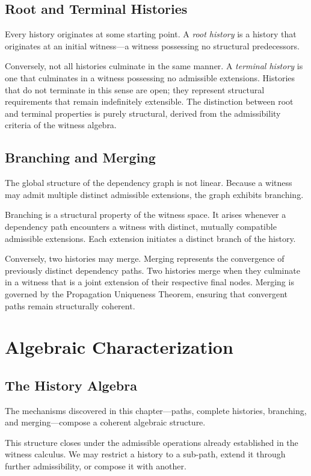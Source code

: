 \documentclass[12pt,anyside]{book}
\begin{document}
\subsection{Root and Terminal Histories}
Every history originates at some starting point. A \textit{root history} is a history that originates at an initial witness---a witness possessing no structural predecessors. 

Conversely, not all histories culminate in the same manner. A \textit{terminal history} is one that culminates in a witness possessing no admissible extensions. Histories that do not terminate in this sense are open; they represent structural requirements that remain indefinitely extensible. The distinction between root and terminal properties is purely structural, derived from the admissibility criteria of the witness algebra.

\subsection{Branching and Merging}
The global structure of the dependency graph is not linear. Because a witness may admit multiple distinct admissible extensions, the graph exhibits branching. 

Branching is a structural property of the witness space. It arises whenever a dependency path encounters a witness with distinct, mutually compatible admissible extensions. Each extension initiates a distinct branch of the history.

Conversely, two histories may merge. Merging represents the convergence of previously distinct dependency paths. Two histories merge when they culminate in a witness that is a joint extension of their respective final nodes. Merging is governed by the Propagation Uniqueness Theorem, ensuring that convergent paths remain structurally coherent.

\section{Algebraic Characterization}

\subsection{The History Algebra}
The mechanisms discovered in this chapter---paths, complete histories, branching, and merging---compose a coherent algebraic structure. 

This structure closes under the admissible operations already established in the witness calculus. We may restrict a history to a sub-path, extend it through further admissibility, or compose it with another.
\end{document}
